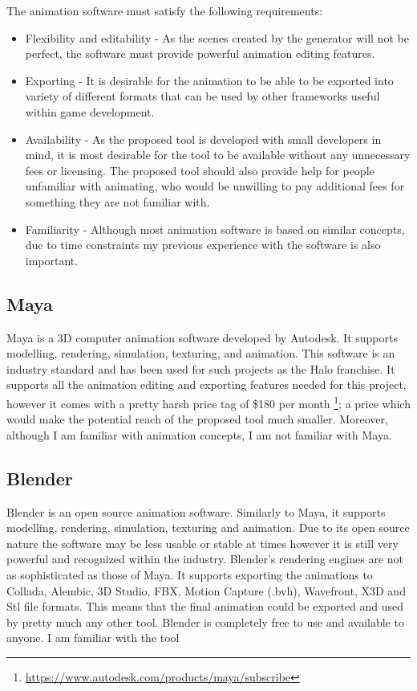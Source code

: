 The animation software must satisfy the following requirements:
\begin{itemize}
\item Flexibility and editability - As the scenes created by the generator will not be perfect, the software must provide powerful animation editing features.
\item Exporting - It is desirable for the animation to be able to be exported into variety of different formats that can be used by other frameworks useful within game development.
\item Availability - As the proposed tool is developed with small developers in mind, it is most desirable for the tool to be available without any unnecessary fees or licensing. The proposed tool should also provide help for people unfamiliar with animating, who would be unwilling to pay additional fees for something they are not familiar with.
\item Familiarity - Although most animation software is based on similar concepts, due to time constraints my previous experience with the software is also important.
\end{itemize}


\subsection{Maya}
Maya is a 3D computer animation software developed by Autodesk. It supports modelling, rendering, simulation, texturing, and animation. This software is an industry standard and has been used for such projects as the Halo franchise. It supports all the animation editing and exporting features needed for this project, however it comes with a pretty harsh price tag of \$180 per month \footnote{\url{https://www.autodesk.com/products/maya/subscribe}}; a price which would make the potential reach of the proposed tool much smaller. Moreover, although I am familiar with animation concepts, I am not familiar with Maya.


\subsection{Blender}
Blender is an open source animation software. Similarly to Maya, it supports modelling, rendering, simulation, texturing and animation. Due to its open source nature the software may be less usable or stable at times however it is still very powerful and recognized within the industry. Blender's rendering engines are not as sophisticated as those of Maya. It supports exporting the animations to Collada, Alembic, 3D Studio, FBX, Motion Capture (.bvh), Wavefront, X3D and Stl file formats. This means that the final animation could be exported and used by pretty much any other tool. Blender is completely free to use and available to anyone. I am familiar with the tool


